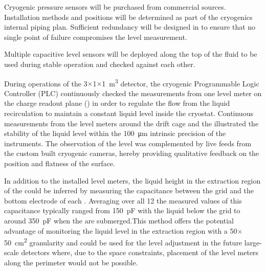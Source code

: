Cryogenic pressure sensors will be purchased from commercial sources.
Installation methods and positions will be determined as part of the
cryogenics internal piping plan.  Sufficient redundancy will be designed in
to ensure that no single point of failure compromises the level measurement.

Multiple capacitive level sensors will be deployed along the top of
the fluid to be used during stable operation and checked against each
other.

During operations of the \num{3}$\times$\num{1}$\times$\SI{1}{\cubic\meter} detector, the cryogenic Programmable Logic Controller (PLC) continuously checked the measurements from one level meter on the charge readout plane () in order to regulate the flow from the liquid recirculation to maintain a constant liquid level inside the cryostat. Continuous measurements from the level meters around the drift cage and the  illustrated the stability of the liquid level within the \SI{100}{\micro\meter} intrinsic precision of the instruments. The observation of the level was complemented by live feeds from the custom built cryogenic cameras, hereby providing qualitative feedback on the position and flatness of the surface.

In addition to the installed level meters, the liquid height in the extraction region of the  could be inferred by measuring the capacitance between the grid and the bottom electrode of each . Averaging over all \num{12}  the measured values of this capacitance typically ranged from \SI{150}{pF} with the liquid below the grid to around  \SI{350}{pF}  when the  are submerged.This method offers the potential advantage of monitoring the liquid level in the  extraction region with a \num{50}$\times$\SI{50}{\cm^2} granularity and could be used for the  level adjustment in the future large-scale detectors where, due to the space constraints, placement of the level meters along the  perimeter would not be possible.

